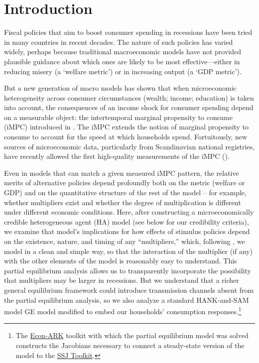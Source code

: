 \documentclass[\econtexRoot/HAFiscal]{subfiles}
\begin{document}
\hypertarget{introduction}{}\par\section{Introduction}\notinsubfile{\label{sec:intro}}
\setcounter{page}{0}

Fiscal policies that aim to boost consumer spending in recessions have been tried in many countries in recent decades.  The nature of such policies has varied widely, perhaps because traditional macroeconomic models have not provided plausible guidance about which ones are likely to be most effective---either in reducing misery (a `welfare metric') or in increasing output (a `GDP metric').

But a new generation of macro models has shown that when microeconomic heterogeneity across consumer circumstances (wealth; income; education) is taken into account, the consequences of an income shock for consumer spending depend on a measurable object: the intertemporal marginal propensity to consume (iMPC) introduced in \cite{auclert2018IKC}.  The iMPC extends the notion of marginal propensity to consume to account for the speed at which households spend.  Fortuitously, new sources of microeconomic data, particularly from Scandinavian national registries, have recently allowed the first high-quality measurements of the iMPC (\cite{fagereng_mpc_2021}).

Even in models that can match a given measured iMPC pattern, the relative merits of alternative policies depend profoundly both on the metric (welfare or GDP) and on the quantitative structure of the rest of the model -- for example, whether multipliers exist and whether the degree of multiplication is different under different economic conditions. Here, after constructing a microeconomically credible heterogeneous agent (HA) model (see below for our credibility criteria), we examine that model's implications for how effects of stimulus policies depend on the existence, nature, and timing of any ``multipliers,'' which, following \cite{kmpHandbook2016}, we model in a clean and simple way, so that the interaction of the multiplier (if any) with the other elements of the model is reasonably easy to understand. %
This partial equilibrium analysis allows us to transparently incorporate the possibility that multipliers may be larger in recessions.  But we understand that a richer general equilibrium framework could introduce transmission channels absent from the partial equilibrium analysis, so we also analyze a standard HANK-and-SAM model GE model modified to embed our households' consumption responses.\footnote{The \href{https://econ-ark.org}{Econ-ARK} toolkit with which the partial equilibrium model was solved constructs the Jacobians necessary to connect a steady-state version of the model to the \href{https://github.com/shade-econ/sequence-jacobian}{SSJ Toolkit}.} 
\end{document}
